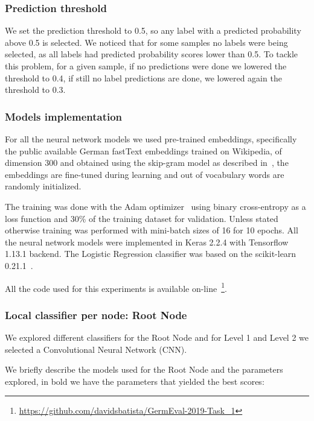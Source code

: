 \documentclass[11pt,a4paper]{article}
\begin{document}
\subsubsection{Prediction threshold}\label{threshold}

We set the prediction threshold to 0.5, so any label with a predicted probability
above 0.5 is selected. We noticed that for some samples no labels were
being selected, as all labels had predicted probability scores lower than 0.5.
To tackle this problem, for a given sample, if no predictions were done we lowered
the threshold to 0.4, if still no label predictions are done, we lowered again
the threshold to 0.3.


\subsubsection{Models implementation}

For all the neural network models we used pre-trained embeddings, specifically
the public available German fastText embeddings trained on Wikipedia, of
dimension 300 and obtained using the skip-gram model as described
in~\citet{bojanowski-etal-2017-enriching}, the embeddings are fine-tuned
during learning and out of vocabulary words are randomly initialized.

The training was done with the Adam optimizer~\cite{journals/corr/KingmaB14}
using binary cross-entropy as a loss function and 30\% of the training
dataset for validation. Unless stated otherwise training was performed with
mini-batch sizes of 16 for 10 epochs. All the neural network models were
implemented in Keras 2.2.4 with Tensorflow 1.13.1 backend. The Logistic
Regression classifier was based on the scikit-learn
0.21.1~\cite{Pedregosa:2011:SML:1953048.2078195}.

All the code used for this experiments is available
on-line~\footnote{\url{https://github.com/davidsbatista/GermEval-2019-Task_1}}.


\subsubsection{Local classifier per node: Root Node}

We explored different classifiers for the Root Node and for Level 1 and Level 2
we selected a Convolutional Neural Network (CNN).

We briefly describe the models used for the Root Node and the parameters explored,
in bold we have the parameters that yielded the best scores:
\end{document}
